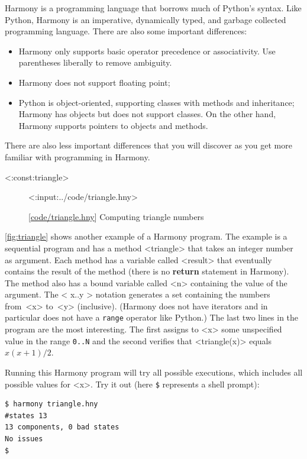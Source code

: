 \documentclass{report}
\newcommand{\harmonylink}[1]{%
[\href{https://harmony.cs.cornell.edu/#1}{\underline{#1}}]%
}
\newenvironment{code}{
\tcolorbox
}{
\endtcolorbox
}
\begin{document}
Harmony is a programming language that borrows much of
Python's syntax.
Like Python, Harmony is an imperative,
dynamically typed, and garbage collected programming language.
There are also some important differences:
\begin{itemize}
\item Harmony only supports basic operator precedence or associativity.
Use parentheses liberally to remove ambiguity.
\item Harmony does not support floating point;
\item Python is object-oriented, supporting classes with methods and
inheritance; Harmony has objects but does not support classes.
On the other hand, Harmony supports pointers to objects and methods.
\end{itemize}
There are also less important differences that you will discover as
you get more familiar with programming in Harmony.

<{:const:triangle}>

\begin{figure}
\begin{code}
<{:input:../code/triangle.hny}>
\end{code}
\caption{\harmonylink{code/triangle.hny} Computing triangle numbers}
\label{fig:triangle}
\end{figure}

\autoref{fig:triangle} shows another example of a Harmony program.
The example is a sequential program
and has a method <{triangle}> that takes
an integer number as argument.  Each method has a variable called
<{result}> that eventually contains the result of the
method (there is no \textbf{return} statement in Harmony).  The method
also has a bound variable called <{n}> containing the value of the
argument.  The <{{ x..y }}> notation generates a set containing the numbers
from~<{x}> to~<{y}> (inclusive).
(Harmony does not have iterators and in particular does
not have a \texttt{range} operator like Python.)
The last two lines in the program are
the most interesting.
The first assigns to <{x}> some unspecified value in the range \texttt{0..N}
and the second verifies that <{triangle(x)}> equals $x(x+1)/2$.

Running this Harmony program will try all possible executions, which
includes all possible values for <{x}>.  Try it out (here \texttt{\$}
represents a shell prompt):

\begin{code}
\begin{verbatim}
$ harmony triangle.hny
#states 13
13 components, 0 bad states
No issues
$
\end{verbatim}
\end{code}
\end{document}
